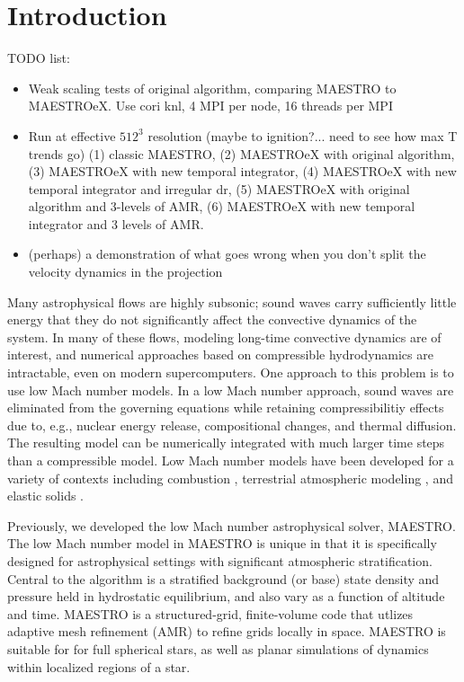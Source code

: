 \section{Introduction} \label{sec:intro}

TODO list:
\begin{itemize}
\item Weak scaling tests of original algorithm, comparing MAESTRO to MAESTROeX.  Use cori knl, 4 MPI per node, 16 threads per MPI
\item Run at effective $512^3$ resolution (maybe to ignition?... need to see how max T trends go) (1) classic MAESTRO, (2) MAESTROeX with original algorithm, (3) MAESTROeX with new temporal integrator, (4) MAESTROeX with new temporal integrator and irregular dr, (5) MAESTROeX with original algorithm and 3-levels of AMR, (6) MAESTROeX with new temporal integrator and 3 levels of AMR.
\item (perhaps) a demonstration of what goes wrong when you don't split the velocity dynamics in the projection
\end{itemize}

Many astrophysical flows are highly subsonic; sound waves carry sufficiently little energy that they do not significantly affect the convective dynamics of the system.
In many of these flows, modeling long-time convective dynamics are of interest, and numerical approaches based on compressible hydrodynamics are intractable, even on modern supercomputers.
One approach to this problem is to use low Mach number models.
In a low Mach number approach, sound waves are eliminated from the governing equations while retaining compressibilitiy effects due to, e.g., nuclear energy release, compositional changes, and thermal diffusion.
The resulting model can be numerically integrated with much larger time steps than a compressible model.
Low Mach number models have been developed for a variety of contexts including combustion \citep{day2000numerical}, terrestrial atmospheric modeling \citep{duarte2015low}, 
and elastic solids \citep{abbate2017all}.

Previously, we developed the low Mach number astrophysical solver, MAESTRO.
The low Mach number model in MAESTRO is unique in that it is specifically designed for astrophysical settings with significant atmospheric stratification.
Central to the algorithm is a stratified background (or base) state density and pressure held in hydrostatic equilibrium, and also vary as a function of altitude and time.
MAESTRO is a structured-grid, finite-volume code that utlizes adaptive mesh refinement (AMR) to refine grids locally in space.
MAESTRO is suitable for for full spherical stars, as well as planar simulations of dynamics within localized regions of a star.

